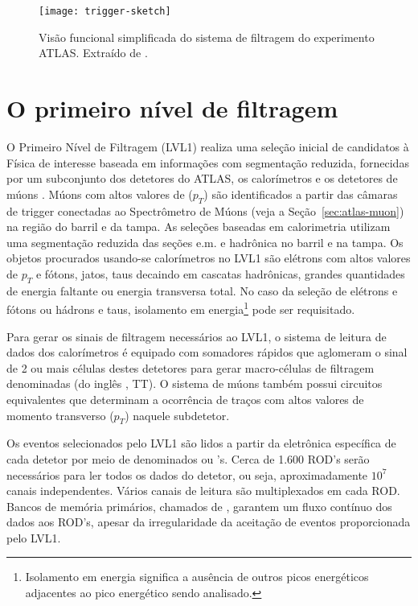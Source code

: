 \begin{figure}
\begin{center}
\texttt{[image: trigger-sketch]}
\end{center}
\caption[Visão funcional simplificada do sistema de filtragem do experimento
ATLAS.]{Visão funcional simplificada do sistema de filtragem do experimento
ATLAS. Extraído de \cite{hlt-tdr}.}
\label{fig:trigger-sketch}
\end{figure}

\section{O primeiro nível de filtragem}
\label{sec:lvl1}

O Primeiro Nível de Filtragem (LVL1) realiza uma seleção inicial de candidatos
à Física de interesse baseada em informações com segmentação reduzida,
fornecidas por um subconjunto dos detetores do ATLAS, os calorímetros e os
detetores de múons \cite{l1-tdr}. Múons com altos valores de  ($p_T$) são identificados a partir das câmaras de trigger
conectadas ao Spectrômetro de Múons (veja a Seção~\ref{sec:atlas-muon}) na
região do barril e da tampa. As seleções baseadas em calorimetria utilizam uma
segmentação reduzida das seções e.m. e hadrônica no barril e na tampa. Os
objetos procurados usando-se calorímetros no LVL1 são elétrons com altos
valores de $p_T$ e fótons, jatos, taus decaindo em cascatas hadrônicas,
grandes quantidades de energia faltante ou energia transversa total. No caso
da seleção de elétrons e fótons ou hádrons e taus, isolamento em
energia\footnote{Isolamento em energia significa a ausência de outros picos
energéticos adjacentes ao pico energético sendo analisado.} pode ser
requisitado.

Para gerar os sinais de filtragem necessários ao LVL1, o sistema de leitura de
dados dos calorímetros é equipado com somadores rápidos \cite{seixas:adder,
lar-tdr} que aglomeram o sinal de 2 ou mais células destes detetores para
gerar macro-células de filtragem denominadas  (do
inglês , TT). O sistema de múons também possui
circuitos equivalentes que determinam a ocorrência de traços com altos valores
de momento transverso ($p_T$) naquele subdetetor.

Os eventos selecionados pelo LVL1 são lidos a partir da eletrônica específica
de cada detetor por meio de  denominados 
ou 's. Cerca de 1.600 ROD's serão necessários para ler todos os dados
do detetor, ou seja, aproximadamente $10^7$ canais independentes. Vários
canais de leitura são multiplexados em cada ROD. Bancos de memória primários,
chamados de , garantem um fluxo contínuo dos dados aos
ROD's, apesar da irregularidade da aceitação de eventos proporcionada pelo
LVL1.

